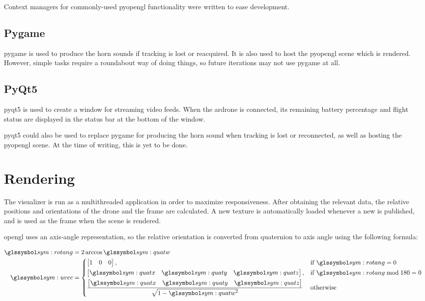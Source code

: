     Context managers for commonly-used \gls{pyopengl} functionality were written to ease development.
    
    \subsection{Pygame}
    \gls{pygame} is used to produce the horn sounds if tracking is lost or reacquired.
    It is also used to host the \gls{pyopengl} scene which is rendered.
    However, simple tasks require a roundabout way of doing things, so future iterations may not use \gls{pygame} at all.

    \subsection{PyQt5}
    \gls{pyqt5} is used to create a window for streaming video feeds.
    When the \gls{ardrone} is connected, its remaining battery percentage and flight status are displayed in the status bar at the bottom of the window.

    \gls{pyqt5} could also be used to replace \gls{pygame} for producing the horn sound when tracking is lost or reconnected, as well as hosting the \gls{pyopengl} scene.
    At the time of writing, this is yet to be done.

  \section{Rendering}
    The visualizer is run as a multithreaded application in order to maximize responsiveness.
    After obtaining the relevant data, the relative positions and orientations of the drone and the frame are calculated.
    A new texture is automatically loaded whenever a new \texttt{} is published, and is used as the frame when the scene is rendered.

    \gls{opengl} uses an axis-angle representation, so the relative orientation is converted from quaternion to axis angle using the following formula:

    \begin{align}
      \sym{rotang} &= 2\arccos\sym{quatw} \\
      \sym{uvec} &= 
      \begin{dcases}
	\begin{bmatrix}1 & 0 & 0\end{bmatrix},& \text{if } \sym{rotang} = 0 \\
	\begin{bmatrix}\sym{quatx} & \sym{quaty} & \sym{quatz}\end{bmatrix},& \text{if } \sym{rotang} \bmod 180 = 0 \\
      \frac{\begin{bmatrix}\sym{quatx} & \sym{quaty} & \sym{quatz}\end{bmatrix}}{\sqrt{1 - \sym{quatw}^2}} & \text{otherwise}
      \end{dcases}
    \end{align}

